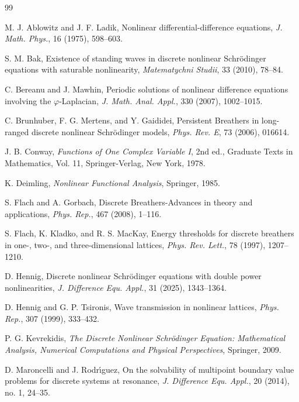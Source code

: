\documentclass[12 pt,twoside]{amsart}
\renewcommand{\phi}{\varphi}
\numberwithin{equation}{section}
\theoremstyle{definition}
\theoremstyle{remark}
\begin{document}
\begin{thebibliography}{99}

M. J. Ablowitz and J. F. Ladik,
Nonlinear differential-difference equations,
\emph{J. Math. Phys.}, 16 (1975), 598--603.

S. M. Bak,
Existence of standing waves in discrete nonlinear Schr\"odinger equations with saturable nonlinearity,
\emph{Matematychni Studii}, 33 (2010), 78--84.

C. Bereanu and J. Mawhin,
Periodic solutions of nonlinear difference equations involving the $\phi$-Laplacian,
\emph{J. Math. Anal. Appl.}, 330 (2007), 1002--1015.

C. Brunhuber, F. G. Mertens, and Y. Gaididei,
Persistent Breathers in long-ranged discrete nonlinear Schr\"odinger models,
\emph{Phys. Rev. E}, 73 (2006), 016614.


J. B. Conway,
\emph{Functions of One Complex Variable I},
2nd ed., Graduate Texts in Mathematics, Vol. 11,
Springer-Verlag, New York, 1978.

K. Deimling,
\emph{Nonlinear Functional Analysis},
Springer, 1985.

S. Flach and A. Gorbach,
Discrete Breathers-Advances in theory and applications,
\emph{Phys. Rep.}, 467 (2008), 1--116.

S. Flach, K. Kladko, and R. S. MacKay,
Energy thresholds for discrete breathers in one-, two-, and three-dimensional lattices,
\emph{Phys. Rev. Lett.}, 78 (1997), 1207--1210.
%

D. Hennig,
Discrete nonlinear Schr\"odinger equations with double power nonlinearities,
\emph{J. Difference Equ. Appl.}, 31 (2025), 1343--1364.

D. Hennig and G. P. Tsironis,
Wave transmission in nonlinear lattices,
\emph{Phys. Rep.}, 307 (1999), 333--432.

P. G. Kevrekidis,
\emph{The Discrete Nonlinear Schr\"odinger Equation: Mathematical Analysis, Numerical Computations and Physical Perspectives},
Springer, 2009.

D. Maroncelli and J. Rodr\'{\i}guez,
On the solvability of multipoint boundary value problems for discrete systems at resonance,
\emph{J. Difference Equ. Appl.}, 20 (2014), no. 1, 24--35.


\end{thebibliography}
\end{document}

